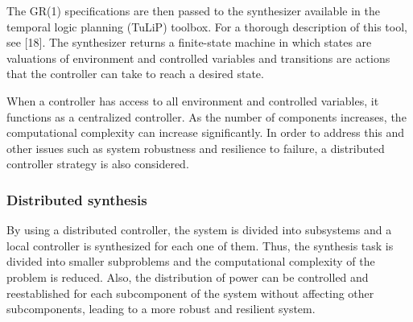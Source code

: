 \documentclass[journal]{IEEEtran}
\begin{document}
The GR(1) specifications are then passed to the synthesizer available in the temporal logic planning (TuLiP) toolbox. For a thorough description of this tool, see [18]. The synthesizer returns a finite-state machine in which states are valuations of environment and controlled variables and transitions are actions that the controller can take to reach a desired state.

When a controller has access to all environment and controlled variables, it functions as a centralized controller. As the number of components increases, the computational complexity can increase significantly. In order to address this and other issues such as system robustness and resilience to failure, a distributed controller strategy is also considered.

\subsubsection{Distributed synthesis}
By using a distributed controller, the system is divided into subsystems and a local controller is synthesized for each one of them. Thus, the synthesis task is divided into smaller subproblems and the computational complexity of the problem is reduced. Also, the distribution of power can be controlled and reestablished for each subcomponent of the system without affecting other subcomponents, leading to a more robust and resilient system. 
\end{document}
